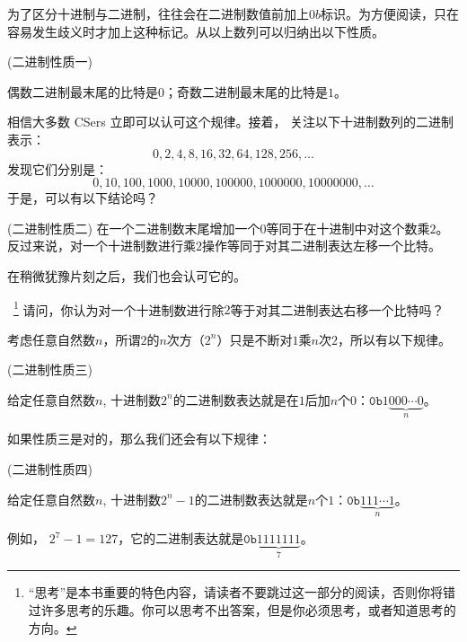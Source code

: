 为了区分十进制与二进制，往往会在二进制数值前加上$0b$标识。为方便阅读，只在容易发生歧义时才加上这种标记。从以上数列可以归纳出以下性质。
\begin{property}{(二进制性质一)}
\label{prop:binary1}

偶数二进制最末尾的比特是$0$；奇数二进制最末尾的比特是$1$。
\end{property}
相信大多数 CSers 立即可以认可这个规律。接着，
关注以下十进制数列的二进制表示：
\[0, 2, 4, 8, 16, 32, 64, 128, 256, \ldots \]
发现它们分别是：
\[0, 10, 100, 1000, 10000, 100000, 1000000, 10000000, \ldots \]
于是，可以有以下结论吗？

\begin{property}{(二进制性质二)}
\label{prop:binary2}
在一个二进制数末尾增加一个$0$等同于在十进制中对这个数乘$2$。反过来说，对一个十进制数进行乘$2$操作等同于对其二进制表达左移一个比特。
\end{property}
在稍微犹豫片刻之后，我们也会认可它的。

\begin{thinking}~\footnote{“思考”是本书重要的特色内容，请读者不要跳过这一部分的阅读，否则你将错过许多思考的乐趣。你可以思考不出答案，但是你必须思考，或者知道思考的方向。}
\label{rem:binary2}
请问，你认为对一个十进制数进行除$2$等于对其二进制表达右移一个比特吗？
\end{thinking}

考虑任意自然数$n$，所谓$2$的$n$次方（$2^n$）只是不断对$1$乘$n$次$2$，所以有以下规律。

\begin{property}{(二进制性质三)}
\label{prop:binary3}

给定任意自然数$n$, 十进制数$2^n$的二进制数表达就是在$1$后加$n$个$0$：$\mathtt{0b}1 \underbrace{000 \cdots 0}_{n}$。
\end{property}
如果性质三是对的，那么我们还会有以下规律：

\begin{property}{(二进制性质四)}
\label{prop:binary4}

给定任意自然数$n$, 十进制数$2^n - 1$的二进制数表达就是$n$个$1$：$\mathtt{0b}\underbrace{111 \cdots 1}_{n}$。
\end{property}
例如，
$2^7 - 1 = 127$，它的二进制表达就是$\mathtt{0b}\underbrace{1111111}_{7}$。

